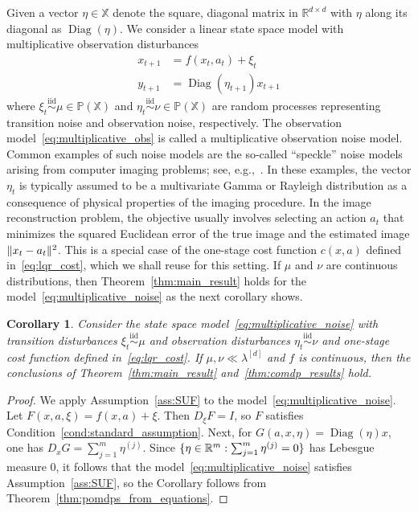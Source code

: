 \documentclass[11pt,onecolumn]{IEEEtran}  %
\newcommand{\Pb}{\mathbb{P}}
\newcommand{\Rb}{\mathbb{R}}
\newcommand{\Xb}{\mathbb{X}}
\newcommand{\iid}{\overset{\mathrm{iid}}{\sim}}
\DeclareMathOperator{\diag}{\mathrm{Diag}}
\DeclarePairedDelimiter{\set}{\{}{\}}
\DeclarePairedDelimiter{\norm}{\|}{\|}
\newtheorem{corollary}{Corollary}
\theoremstyle{definition}
\begin{document}
Given a vector $\eta \in \Xb$ denote the square, diagonal matrix in $\Rb^{d \times d}$ with $\eta$ along its diagonal as $\diag(\eta)$. We consider a linear state space model with multiplicative observation disturbances
\begin{subequations} \label{eq:multiplicative_noise}
    \begin{align}
        x_{t+1} &= f(x_t, a_t) + \xi_{t} \\
        y_{t+1} &= \diag(\eta_{t+1}) x_{t+1} \label{eq:multiplicative_obs}
    \end{align}
\end{subequations}
where $\xi_t \iid \mu \in \Pb(\Xb)$ and $\eta_{t} \iid \nu \in \Pb(\Xb)$ are random processes representing transition noise and observation noise, respectively. The observation model~\eqref{eq:multiplicative_obs} is called a multiplicative observation noise model. Common examples of such noise models are the so-called ``speckle'' noise models arising from computer imaging problems; see, e.g.,~\cite{singh_archives_2021, aubert_variational_2008, yun_multiplicative_2012, bioucas-dias_multiplicative_2010}. In these examples, the vector $\eta_{t}$ is typically assumed to be a multivariate Gamma or Rayleigh distribution as a consequence of physical properties of the imaging procedure. In the image reconstruction problem, the objective usually involves selecting an action $a_t$ that minimizes the squared Euclidean error of the true image and the estimated image $\norm{x_t-a_t}^2$. This is a special case of the one-stage cost function $c(x,a)$ defined in~\eqref{eq:lqr_cost}, which we shall reuse for this setting. If $\mu$ and $\nu$ are continuous distributions, then Theorem~\ref{thm:main_result} holds for the model~\eqref{eq:multiplicative_noise} as the next corollary shows.

\begin{corollary}
    Consider the state space model~\eqref{eq:multiplicative_noise} with transition disturbances $\xi_t \iid \mu$ and observation disturbances $\eta_t \iid \nu$ and one-stage cost function defined in~\eqref{eq:lqr_cost}. If $\mu, \nu \ll \lambda^{[d]}$ and $f$ is continuous, then the conclusions of Theorem~\ref{thm:main_result} and~\ref{thm:comdp_results} hold.
\end{corollary}

\begin{proof}
    We apply Assumption~\ref{ass:SUF} to the model~\eqref{eq:multiplicative_noise}. Let $F(x,a,\xi) = f(x,a) + \xi$. Then $D_\xi F = I$, so $F$ satisfies Condition~\ref{cond:standard_assumption}. Next, for $G(a,x,\eta) = \diag(\eta) x$, one has $D_x G = \sum_{j=1}^{m} \eta^{(j)}$. Since $\set{\eta \in \Rb^m : \sum_{j=1}^{m} \eta^{(j)} = 0}$ has Lebesgue measure 0, it follows that the model~\eqref{eq:multiplicative_noise} satisfies Assumption~\ref{ass:SUF}, so the Corollary follows from Theorem~\ref{thm:pomdps_from_equations}.
\end{proof}
\end{document}
